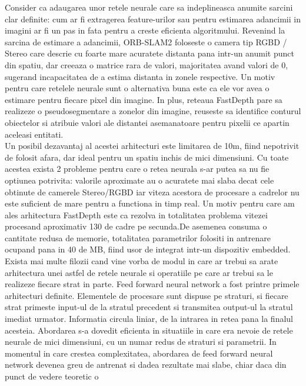 \documentclass[12pt,a4paper]{report}
\begin{document}
Consider ca adaugarea unor retele neurale care sa indeplineasca anumite sarcini clar definite:
cum ar fi extragerea feature-urilor sau pentru estimarea adancimii in imagini ar fi un pas in fata
pentru a creste eficienta algoritmului. Revenind la sarcina de estimare a adancimii, ORB-SLAM2
foloseste o camera tip RGBD / Stereo care descrie cu foarte mare acuratete distanta pana intr-un
anumit punct din spatiu, dar creeaza o matrice rara de valori, majoritatea avand valori de 0,
sugerand incapacitatea de a estima distanta in zonele respective. Un motiv pentru care retelele
neurale sunt o alternativa buna este ca ele vor avea o estimare pentru fiecare pixel din imagine.
In plus, reteaua FastDepth pare sa realizeze o pseudosegmentare a zonelor din imagine, reuseste
sa identifice conturul obiectelor si atribuie valori ale distantei asemanatoare pentru pixelii
ce apartin aceleasi entitati. \\
Un posibil dezavantaj al acestei arhitecturi este limitarea de 10m, fiind nepotrivit
de folosit afara, dar ideal pentru un spatiu inchis de mici dimensiuni. Cu toate acestea exista 2 
probleme pentru care o retea neurala s-ar putea sa nu fie optiunea potrivita: valorile aproximate 
au o acuratete mai slaba decat cele obtinute de camerele Stereo/RGBD iar viteza acestora de 
procesare a cadrelor nu este suficient de mare pentru a functiona in timp real.
Un motiv pentru care am ales arhitectura FastDepth este ca rezolva in totalitatea problema vitezei procesand 
aproximativ 130 de cadre pe secunda.\@ De asemenea consuma o cantitate redusa de memorie, totalitatea 
parametrilor folositi in antrenare ocupand pana in 40 de MB, fiind usor de integrat intr-un 
dispozitiv embedded. \\ Exista mai multe filozii cand vine vorba de modul in care ar trebui sa
arate arhitectura unei astfel de retele neurale si operatiile pe care ar trebui sa le realizeze
fiecare strat in parte. Feed forward neural network a fost printre primele arhitecturi definite. 
Elementele de procesare sunt dispuse pe straturi, si fiecare strat primeste input-ul de la stratul 
precedent si transmitea output-ul la stratul imediat urmator. Informatia circula liniar, de la 
intrarea in retea pana la finalul acesteia. Abordarea s-a dovedit eficienta in situatiile 
in care era nevoie de retele neurale de mici dimensiuni, cu un numar redus de straturi si 
parametrii. In momentul in care crestea complexitatea, abordarea de feed forward neural network 
devenea greu de antrenat si dadea rezultate mai slabe, chiar daca din punct de vedere teoretic o
\end{document}
